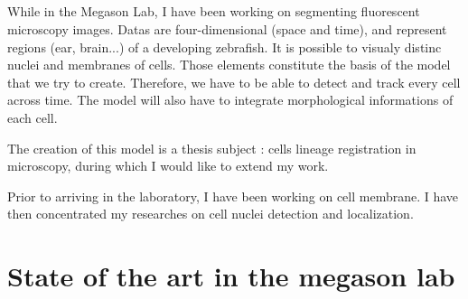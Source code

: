 %
%
%
%
%

\subsection*{}

While in the Megason Lab, I have been working on segmenting fluorescent microscopy images.
Datas are four-dimensional (space and time), and represent regions (ear, brain...) of a developing zebrafish.
It is possible to visualy distinc nuclei and membranes of cells. Those elements constitute the basis of the model that we try to create.
Therefore, we have to be able to detect and track every cell across time. The model will also have to integrate morphological informations of each cell.

The creation of this model is a thesis subject : cells lineage registration in microscopy, during which I would like to extend my work.

Prior to arriving in the laboratory, I have been working on cell membrane. I have then concentrated my researches on cell nuclei detection and localization.




%
%

\section{State of the art in the megason lab}

